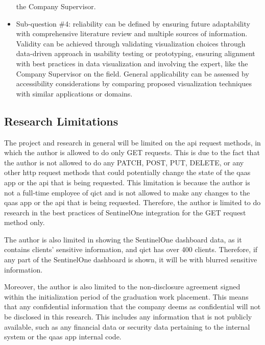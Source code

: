 \begin{multicols}{2}
\begin{itemize}[label=-]
                  the Company Supervisor.
            \item Sub-question \#4: reliability can be defined by ensuring future adaptability with comprehensive
                  literature review and multiple sources of information. Validity can be achieved through validating
                  visualization choices through data-driven approach in usability testing or  prototyping, ensuring
                  alignment with best practices in data visualization and involving the expert, like the Company
                  Supervisor on the field. General applicability can be assessed by accessibility considerations by
                  comparing proposed visualization techniques with similar applications or domains.
      \end{itemize}
      \subsection{Research Limitations}
      The project and research in general will be limited on the \acrshort{api} request methods, in which the author
      is allowed to do only GET requests. This is due to the fact that the author is not allowed to do any PATCH,
      POST, PUT, DELETE, or any other \acrshort{http} request methods that could potentially change the state of the
      \acrshort{qaas} app or the \acrshort{api} that is being requested. This limitation is because the author is not a
      full-time employee of \acrshort{qict} and is not allowed to make any changes to the \acrshort{qaas} app or the
      \acrshort{api} that is being requested. Therefore, the author is limited to do research in the best practices
      of SentinelOne integration for the GET request method only.

      The author is also limited in showing the SentinelOne dashboard data, as it contains clients' sensitive
      information, and \acrshort{qict} has over 400 clients. Therefore, if any part of the SentinelOne dashboard is
      shown, it will be with blurred sensitive information.

      Moreover, the author is also limited to the non-disclosure agreement signed within the initialization period of
      the graduation work placement. This means that any confidential information that the company deems as confidential
      will not be disclosed in this research. This includes any information that is not publicly available, such as any
      financial data or security data pertaining to the internal system or the \acrshort{qaas} app internal code.
\end{multicols}
